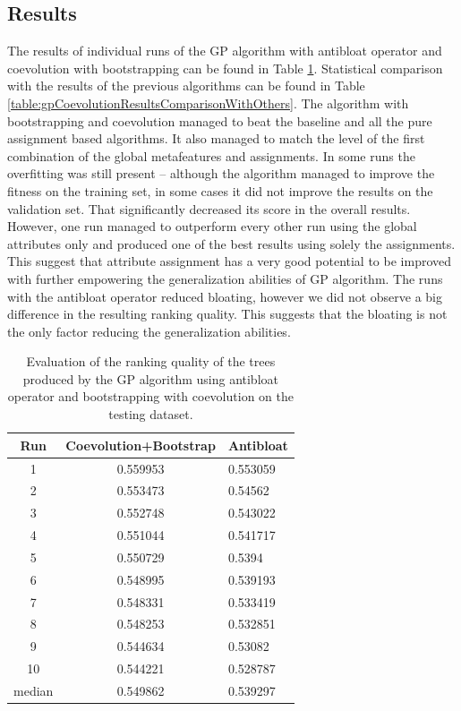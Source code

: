  \subsection{Results}
 The results of individual runs of the GP algorithm with antibloat operator and coevolution with bootstrapping can be found in Table \ref{table:gpCoevolutionResults}. Statistical comparison with the results of the previous algorithms can be found in Table \ref{table:gpCoevolutionResultsComparisonWithOthers}. The algorithm with bootstrapping and coevolution managed to beat the baseline and all the pure assignment based algorithms. It also managed to match the level of the first combination of the global metafeatures and assignments. In some runs the overfitting was still present -- although the algorithm managed to improve the fitness on the training set, in some cases it did not improve the results on the validation set. That significantly decreased its score in the overall results. However, one run managed to outperform every other run using the global attributes only and produced one of the best results using solely the assignments. This suggest that attribute assignment has a very good potential to be improved with further empowering the generalization abilities of GP algorithm.
 The runs with the antibloat operator reduced bloating, however we did not observe a big difference in the resulting ranking quality. This suggests that the bloating is not the only factor reducing the generalization abilities.
 
 \begin{table} 
 	\caption{Evaluation of the ranking quality of the trees produced by the GP algorithm using antibloat operator and bootstrapping with coevolution on the testing dataset.}
 	\label{table:gpCoevolutionResults}
 	\centering 
 	\renewcommand{\arraystretch}{1.3}
 	\begin{tabular}{c c l}
 		\hline %
 		Run &  Coevolution+Bootstrap & Antibloat\\
 		\hline 
 		1 & 0.559953 & 0.553059 \\ 
 		2 &	0.553473 & 0.54562 \\
 		3 & 0.552748 & 0.543022 \\
 		4 & 0.551044 & 0.541717 \\
 		5 &	0.550729 & 0.5394 \\
 		6 & 0.548995 & 0.539193 \\
 		7 &	0.548331 & 0.533419 \\
 		8 & 0.548253 & 0.532851 \\
 		9 & 0.544634 & 	0.53082 \\
 		10 & 0.544221 & 0.528787 \\
 		median & 0.549862 & 0.539297
 				 	
 	\end{tabular}
 \end{table}
 
